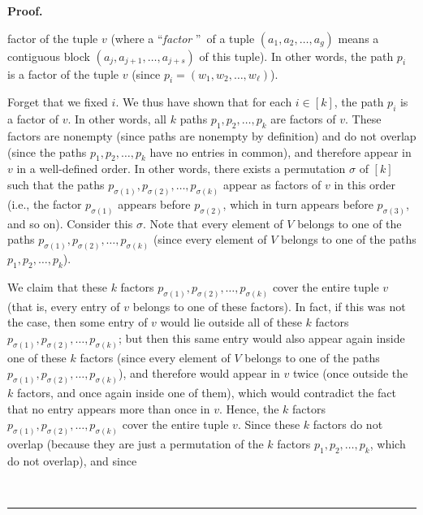 \documentclass[numbers=enddot,12pt,final,onecolumn,notitlepage]{scrartcl}%
\numberwithin{exer}{section}
\theoremstyle{definition}
\newenvironment{proof}[1][Proof]{\noindent\textbf{#1.} }{\ \rule{0.5em}{0.5em}}
\newenvironment{verlong}{}{}
\begin{document}
\begin{verlong}
\begin{proof}
{factor of the tuple $v$ (where a \textquotedblleft\emph{factor}%
\textquotedblright\ of a tuple $\left(  a_{1},a_{2},\ldots,a_{g}\right)  $
means a contiguous block $\left(  a_{j},a_{j+1},\ldots,a_{j+s}\right)  $ of
this tuple). In other words, the path $p_{i}$ is a factor of the tuple $v$
(since $p_{i}=\left(  w_{1},w_{2},\ldots,w_{\ell}\right)  $).
\par
Forget that we fixed $i$. We thus have shown that for each $i\in\left[
k\right]  $, the path $p_{i}$ is a factor of $v$. In other words, all $k$
paths $p_{1},p_{2},\ldots,p_{k}$ are factors of $v$. These factors are
nonempty (since paths are nonempty by definition) and do not overlap (since
the paths $p_{1},p_{2},\ldots,p_{k}$ have no entries in common), and therefore
appear in $v$ in a well-defined order. In other words, there exists a
permutation $\sigma$ of $\left[  k\right]  $ such that the paths
$p_{\sigma\left(  1\right)  },p_{\sigma\left(  2\right)  },\ldots
,p_{\sigma\left(  k\right)  }$ appear as factors of $v$ in this order (i.e.,
the factor $p_{\sigma\left(  1\right)  }$ appears before $p_{\sigma\left(
2\right)  }$, which in turn appears before $p_{\sigma\left(  3\right)  }$, and
so on). Consider this $\sigma$. Note that every element of $V$ belongs to one
of the paths $p_{\sigma\left(  1\right)  },p_{\sigma\left(  2\right)  }%
,\ldots,p_{\sigma\left(  k\right)  }$ (since every element of $V$ belongs to
one of the paths $p_{1},p_{2},\ldots,p_{k}$).
\par
We claim that these $k$ factors $p_{\sigma\left(  1\right)  },p_{\sigma\left(
2\right)  },\ldots,p_{\sigma\left(  k\right)  }$ cover the entire tuple $v$
(that is, every entry of $v$ belongs to one of these factors). In fact, if
this was not the case, then some entry of $v$ would lie outside all of these
$k$ factors $p_{\sigma\left(  1\right)  },p_{\sigma\left(  2\right)  }%
,\ldots,p_{\sigma\left(  k\right)  }$; but then this same entry would also
appear again inside one of these $k$ factors (since every element of $V$
belongs to one of the paths $p_{\sigma\left(  1\right)  },p_{\sigma\left(
2\right)  },\ldots,p_{\sigma\left(  k\right)  }$), and therefore would appear
in $v$ twice (once outside the $k$ factors, and once again inside one of
them), which would contradict the fact that no entry appears more than once in
$v$. Hence, the $k$ factors $p_{\sigma\left(  1\right)  },p_{\sigma\left(
2\right)  },\ldots,p_{\sigma\left(  k\right)  }$ cover the entire tuple $v$.
Since these $k$ factors do not overlap (because they are just a permutation of
the $k$ factors $p_{1},p_{2},\ldots,p_{k}$, which do not overlap), and since
}
\end{proof}
\end{verlong}
\end{document}

